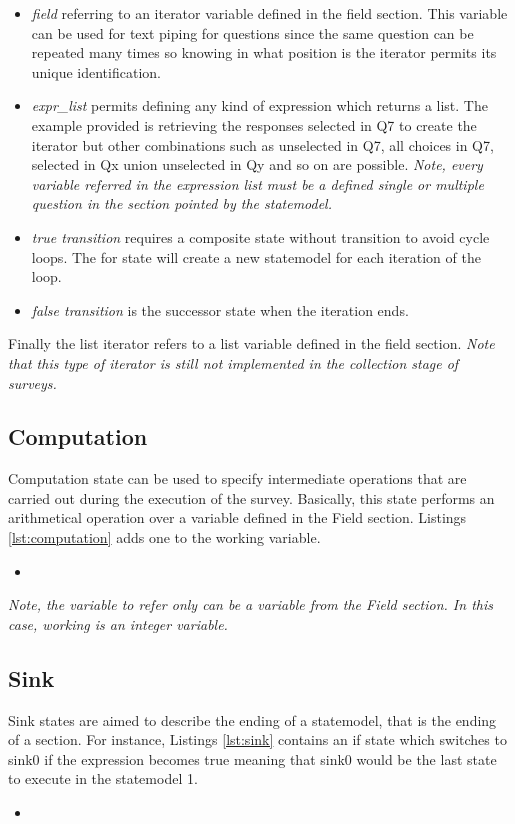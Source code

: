 \documentclass{article}
\newcommand{\insertcode}[3]{\begin{itemize}\item[]\end{itemize}} %
\begin{document}
\begin{itemize}
	\item \emph{field} referring to an iterator variable defined in the field section. This variable can be used for text piping for questions since the same question can be repeated many times so knowing in what position is the iterator permits its unique identification.
	\item \emph{expr\_list} permits defining any kind of expression which returns a list. The example provided is retrieving the responses selected in Q7 to create the iterator but other combinations such as unselected in Q7, all choices in Q7, selected in Qx union unselected in Qy and so on are possible. \emph{Note, every variable referred in the expression list must be a defined single or multiple question in the section pointed by the statemodel.}
	\item \emph{true transition} requires a composite state without transition to avoid cycle loops. The for state will create a new 
statemodel for each iteration of the loop.
	\item \emph{false transition} is the successor state when the iteration ends.
\end{itemize}
Finally the list iterator refers to a list variable defined in the field section. \emph{Note that this type of iterator is still not implemented in the collection stage of surveys.}
	\label{subsec:for}
	\subsection{Computation}
	Computation state can be used to specify intermediate operations that are carried out during the execution of the survey. Basically, this state performs an arithmetical operation over a variable defined in the Field section. Listings \ref{lst:computation} adds one to the working variable.
\insertcode{"scripts/computation.xml"}{Computation state example}{lst:computation}
\emph{Note, the variable to refer only can be a variable from the Field section. In this case, working is an integer variable.}
	\subsection{Sink}
	Sink states are aimed to describe the ending of a statemodel, that is the ending of a section. For instance, Listings \ref{lst:sink} contains an if state which switches to sink0 if the expression becomes true meaning that sink0 would be the last state to execute in the statemodel 1.
\insertcode{"scripts/sink.xml"}{Sink state example}{lst:sink}
\end{document}
